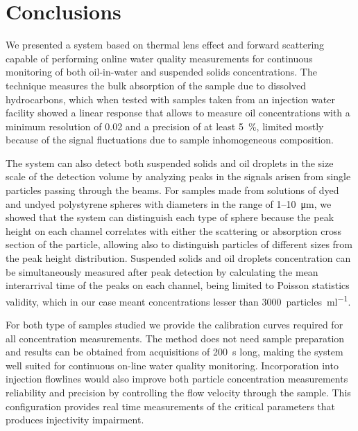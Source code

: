 \documentclass[10pt,authoryear,twocolumn]{article}
\begin{document}



\section{Conclusions}
\label{Conclusions}
We presented a system based on thermal lens effect and forward scattering capable of performing online water quality measurements for continuous monitoring of both oil-in-water and suspended solids concentrations. The technique measures the bulk absorption of the sample due to dissolved hydrocarbons, which when tested with samples taken from an injection water facility showed a linear response that allows to measure oil concentrations with a minimum resolution of \SI{0.02}{\ppm} and a precision of at least \SI{5}{\percent}, limited mostly because of the signal fluctuations due to sample inhomogeneous composition.

The system can also detect both suspended solids and oil droplets in the size scale of the detection volume by analyzing peaks in the signals arisen from single particles passing through the beams. For samples made from solutions of dyed and undyed polystyrene spheres with diameters in the range of \SI{1}{}--\SI{10}{\micro\metre}, we showed that the system can distinguish each type of sphere because the peak height on each channel correlates with either the scattering or absorption cross section of the particle, allowing also to distinguish particles of different sizes from the peak height distribution. Suspended solids and oil droplets concentration can be simultaneously measured after peak detection by calculating the mean interarrival time of the peaks on each channel, being limited to Poisson statistics validity, which in our case meant concentrations lesser than \SI{3000}{particles\per\milli\litre}.

For both type of samples studied we provide the calibration curves required for all concentration measurements. The method does not need sample preparation and results can be obtained from acquisitions of \SI{200}{\second} long, making the system well suited for continuous on-line water quality monitoring. Incorporation into injection flowlines would also improve both particle concentration measurements reliability and precision by controlling the flow velocity through the sample. This configuration provides real time measurements of the critical parameters that produces injectivity impairment.


\printbibliography
\end{document}
